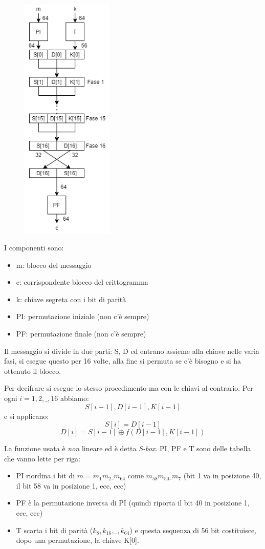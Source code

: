 \begin{figure}
    \includegraphics[width = 125pt]{DES_1.png}
\end{figure} 
I componenti sono:
\begin{itemize}
    \item m: blocco del messaggio
    \item c: corrispondente blocco del crittogramma
    \item k: chiave segreta con i bit di parità
    \item PI: permutazione iniziale (non c'è sempre)
    \item PF: permutazione finale (non c'è sempre)
\end{itemize}
Il messaggio si divide in due parti: S, D ed entrano assieme alla chiave nelle varia fasi, si esegue questo per 16 volte, alla fine si permuta se c'è bisogno e si ha ottenuto il blocco.

Per decifrare si esegue lo stesso procedimento ma con le chiavi al contrario. Per ogni $i=1, 2, \_, 16$ abbiamo:
$$ S[i-1], D[i-1], K[i-1] $$
e si applicano:
$$ S[i] = D[i-1] $$
$$ D[i] = S[i-1] \oplus f(D[i-1],K[i-1]) $$

La funzione usata è \emph{non} lineare ed è detta \emph{S-box}. PI, PF e T sono delle tabella che vanno lette per riga:
\begin{itemize}
    \item PI riordina i bit di $m=m_1m_2\_m_64$ come $m_{58}m_{50}\_m_{7}$ (bit 1 va in posizione 40, il bit 58 va in posizione 1, ecc, ecc)
    \item PF è la permutazione inversa di PI (quindi riporta il bit 40 in posizione 1, ecc, ecc)
    \item T scarta i bit di parità ($k_8, k_{16}, \_, k_{64}$) e questa sequenza di 56 bit costituisce, dopo una permutazione, la chiave K[0].
\end{itemize}

